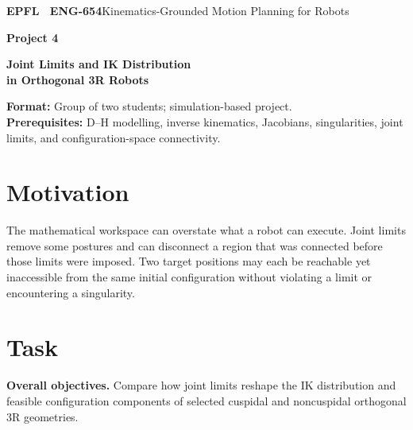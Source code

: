 \documentclass[11pt,a4paper]{article}
\begin{document}
{\small\textbf{EPFL \textbar\ ENG-654}\hfill Kinematics-Grounded Motion Planning for Robots}
\vspace{5mm}

{\color{epflred}\Large\bfseries Project 4}

{\LARGE\bfseries Joint Limits and IK Distribution\\in Orthogonal 3R Robots\par}

\textbf{Format:} Group of two students; simulation-based project.\\
\textbf{Prerequisites:} D--H modelling, inverse kinematics, Jacobians,
singularities, joint limits, and configuration-space connectivity.

\section*{Motivation}
The mathematical workspace can overstate what a robot can execute. Joint
limits remove some postures and can disconnect a region that was connected
before those limits were imposed. Two target positions may each be reachable
yet inaccessible from the same initial configuration without violating a limit
or encountering a singularity.

\section*{Task}
\textbf{Overall objectives.} Compare how joint limits reshape the IK distribution and feasible
configuration components of selected cuspidal and noncuspidal orthogonal 3R
geometries.
\end{document}
